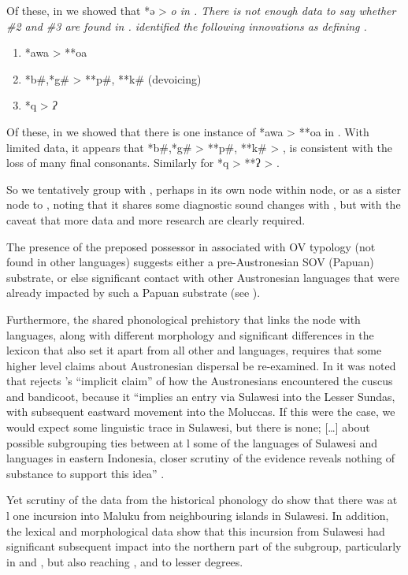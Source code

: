 Of these, in  we showed that *ə > \it{o} in .
There is not enough data to say whether {\#}2
and {\#}3 are found in .
\citet{Mead2003b} identified the following innovations as defining
.

\begin{enumerate}[noitemsep]
	\item	*awa > **oa
	\item	*b{\#},*g{\#} > **p{\#}, **k{\#} (devoicing)
	\item	*q > \it{ʔ} 
\end{enumerate}

Of these, in  we showed that there is one instance
of *awa > **oa in .
With limited data, it appears that *b{\#},*g{\#} > **p{\#},
**k{\#} > {\0}, is consistent with the loss of many final consonants.
Similarly for *q > **ʔ > {\0}.

So we tentatively group  with ,
perhaps in its own node within  node,
or as a sister node to ,
noting that it shares some diagnostic sound changes with ,
but with the caveat that more data
and more research are clearly required.

The presence of the preposed possessor in  associated
with OV typology (not found in other  languages)
suggests either a pre-Austronesian SOV (Papuan) substrate,
or else significant contact with other Austronesian languages
that were already impacted by such a Papuan substrate (see ).

Furthermore, the shared phonological prehistory that links the
 node with  languages,
along with different morphology
and significant differences in the lexicon that also set it apart
from all other 
and  languages, requires that some higher level
claims about Austronesian dispersal be re-examined.
In  it was noted that \citet{Blust2012b} rejects \citeauthor{Schapper2011}’s
\citeyear{Schapper2011} “implicit claim” \citep[273]{Blust2012b} of how the Austronesians
encountered the cuscus and bandicoot, because it
“implies an entry via Sulawesi into
the Lesser Sundas, with subsequent eastward movement into the Moluccas.
If this were the case,
we would expect some linguistic trace in Sulawesi,
but there is none; [{\ldots}] about possible subgrouping ties
between at l some of the languages of Sulawesi
and languages in eastern Indonesia,
closer scrutiny of the evidence reveals nothing of substance
to support this idea” \citep[274]{Blust2012b}.

Yet scrutiny of the  data from the historical phonology
do show that there was at l one incursion into Maluku from
neighbouring islands in Sulawesi.
In addition, the lexical
and morphological data show that this incursion from Sulawesi
had significant subsequent impact into the northern part of the
 subgroup, particularly in  and , but also reaching ,
 and  to lesser degrees.

